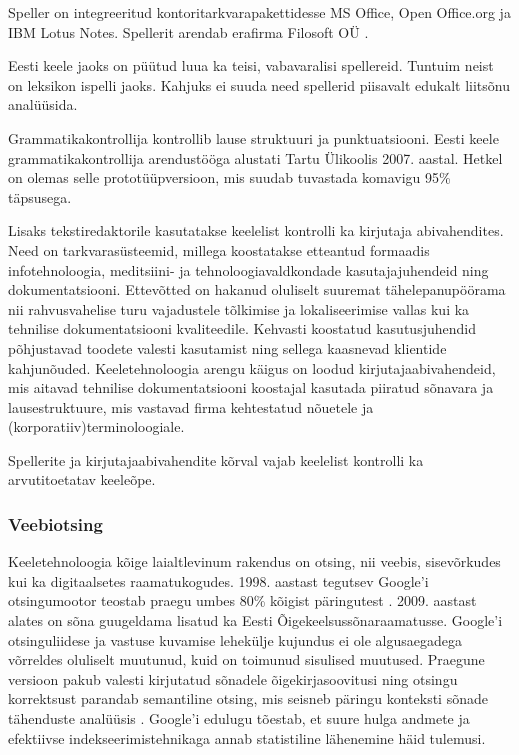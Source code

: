 \begin{multicols}{2}
Speller on integreeritud kontoritarkvarapakettidesse MS Office, Open Office.org ja IBM Lotus Notes. 
Spellerit arendab era\-firma Filosoft OÜ \cite{Filosoft}.

Eesti keele jaoks on püütud luua ka teisi, vabavaralisi spellereid. 
Tuntuim neist on leksikon ispelli jaoks. 
Kahjuks ei suuda need spellerid piisavalt edukalt liitsõnu analüüsida.

Grammatikakontrollija kontrollib lause struktuuri ja punktuatsiooni. 
Eesti keele grammatikakontrollija arendustööga alustati Tartu Ülikoolis 2007. aastal.
Hetkel on olemas selle prototüüpversioon, mis suu\-dab tuvastada komavigu 95\% täpsusega.

Lisaks tekstiredaktorile kasutatakse keelelist kontrolli ka kirjutaja abivahendites. 
Need on tarkvarasüsteemid, millega koostatakse etteantud formaadis infotehnoloogia, meditsiini- ja tehnoloogiavaldkondade kasutajajuhendeid ning dokumentatsiooni. 
Ettevõtted on hakanud oluliselt suuremat tähelepanupöörama nii rahvusvahelise turu vajadustele tõlkimise ja lokaliseerimise vallas kui ka tehnilise dokumentatsiooni kvaliteedile. 
Kehvasti koostatud kasutusjuhendid põhjustavad toodete valesti kasutamist ning sellega kaasnevad klientide kahjunõuded. 
Keeletehnoloogia arengu käigus on loodud kirjutajaabivahendeid, mis aitavad tehnilise dokumentatsiooni koostajal kasutada piiratud sõnavara ja lausestruktuure, mis vastavad firma kehtestatud nõuetele ja (korporatiiv)terminoloogiale. 

Spellerite ja kirjutajaabivahendite kõrval vajab keelelist kontrolli ka arvutitoetatav keeleõpe. 

\subsubsection{Veebiotsing}

Keeletehnoloogia kõige laialtlevinum rakendus on otsing, nii veebis, sisevõrkudes kui ka digitaalsetes raamatukogudes. 
1998. aastast tegutsev Google’i otsingumootor teostab praegu umbes 80\% kõigist päringutest \cite{spi1}. 
2009. aastast alates on sõna guugeldama lisatud ka Eesti Õigekeelsussõnaraamatusse. 
Google’i otsinguliidese ja vastuse kuvamise lehekülje kujundus ei ole algusaegadega võrreldes oluliselt muutunud, kuid on toimunud sisulised muutused. 
Praegune versioon pakub valesti kirjutatud sõnadele õigekirjasoovitusi ning otsingu korrektsust parandab semantiline otsing, mis seisneb päringu konteksti sõnade tähenduste analüüsis \cite{pc1}. 
Google’i edulugu tõestab, et suure hulga andmete ja efektiivse indekseerimistehnikaga annab statistiline lähenemine häid tulemusi. 


\end{multicols}
